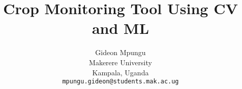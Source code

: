 \documentclass[10pt,twocolumn,letterpaper]{article}
\begin{document}
\title{Crop Monitoring Tool Using CV and ML}

\author{Gideon Mpungu\\
Makerere University\\
Kampala, Uganda\\
{\tt\small mpungu.gideon@students.mak.ac.ug} 
}

\maketitle
\end{document}

